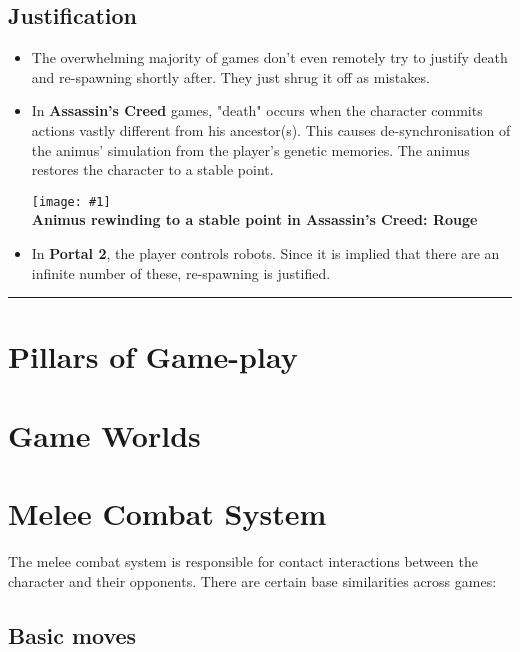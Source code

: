 \documentclass[12pt]{article}
\newcommand{\drawline}{\vspace{2mm}\hrule}
\newcommand{\fig}[3]{\begin{center} \texttt{[image: \#1]}\\ \textbf{#3} \end{center}}
\begin{document}
\subsection{Justification}

\begin{itemize}

\item The overwhelming majority of games don't even remotely try to justify death and re-spawning shortly after. They just shrug it off as mistakes.

\item In \textbf{Assassin's Creed} games, "death" occurs when the character commits actions vastly different from his ancestor(s). This causes de-synchronisation of the animus' simulation from the player's genetic memories. The animus restores the character to a stable point.

\fig{ac_rouge_animus.jpg}{0.3}{Animus rewinding to a stable point in Assassin's Creed: Rouge}

\item In \textbf{Portal 2}, the player controls robots. Since it is implied that there are an infinite number of these, re-spawning is justified.

\end{itemize}

\drawline

\section{Pillars of Game-play}

\section{Game Worlds}

\section{Melee Combat System}

The melee combat system is responsible for contact interactions between the character and their opponents. There are certain base similarities across games:

\subsection{Basic moves}
\end{document}
